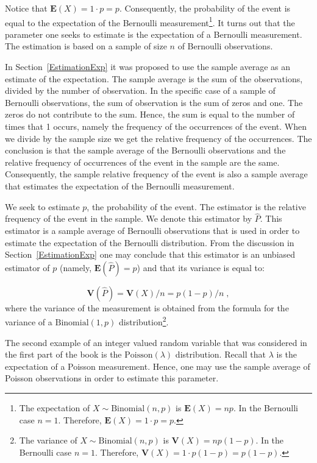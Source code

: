 \documentclass[]{krantz}
\newcommand{\Expec}{\mathbf{E}}
\newcommand{\Var}{\mathbf{V}}
\theoremstyle{definition}
\theoremstyle{definition}
\theoremstyle{definition}
\theoremstyle{remark}
\begin{document}
Notice that \(\Expec(X) = 1 \cdot p = p\). Consequently, the probability
of the event is equal to the expectation of the Bernoulli
measurement\footnote{The expectation of \(X\sim\mathrm{Binomial}(n,p)\) is
  \(\Expec(X)=np\). In the Bernoulli case \(n=1\). Therefore,
  \(\Expec(X) = 1\cdot p = p\).}. It turns out that the parameter one seeks to estimate
is the expectation of a Bernoulli measurement. The estimation is based
on a sample of size \(n\) of Bernoulli observations.

In Section~\ref{EstimationExp} it was proposed to use the sample
average as an estimate of the expectation. The sample average is the sum
of the observations, divided by the number of observation. In the
specific case of a sample of Bernoulli observations, the sum of
observation is the sum of zeros and one. The zeros do not contribute to
the sum. Hence, the sum is equal to the number of times that 1 occurs,
namely the frequency of the occurrences of the event. When we divide by
the sample size we get the relative frequency of the occurrences. The
conclusion is that the sample average of the Bernoulli observations and
the relative frequency of occurrences of the event in the sample are the
same. Consequently, the sample relative frequency of the event is also a
sample average that estimates the expectation of the Bernoulli
measurement.

We seek to estimate \(p\), the probability of the event. The estimator is
the relative frequency of the event in the sample. We denote this
estimator by \(\hat P\). This estimator is a sample average of Bernoulli
observations that is used in order to estimate the expectation of the
Bernoulli distribution. From the discussion in
Section~\ref{EstimationExp} one may conclude that this estimator is an
unbiased estimator of \(p\) (namely, \(\Expec(\hat P) = p\)) and that its
variance is equal to:

\[\Var(\hat P) = \Var(X) / n = p(1-p)/n\;,\] where
the variance of the measurement is obtained from the formula for the
variance of a \(\mathrm{Binomial}(1,p)\) distribution\footnote{The variance of \(X\sim\mathrm{Binomial}(n,p)\) is
  \(\Var(X)=np(1-p)\). In the Bernoulli case \(n=1\). Therefore,
  \(\Var(X) = 1\cdot p(1-p) = p(1-p)\).}.

The second example of an integer valued random variable that was
considered in the first part of the book is the
\(\mathrm{Poisson}(\lambda)\) distribution. Recall that \(\lambda\) is the
expectation of a Poisson measurement. Hence, one may use the sample
average of Poisson observations in order to estimate this parameter.
\end{document}
